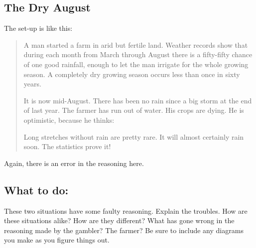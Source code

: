 \documentclass[12pt,letterpaper]{article}
\begin{document}
\subsection*{The Dry August} The set-up is like this:
\begin{quotation}
A man started a farm in arid but fertile land. 
Weather records show that during each month from March through August there is a fifty-fifty chance of one good rainfall, enough to let the man irrigate for the whole growing season. 
A completely dry growing season occurs less than once in sixty years.

It is now mid-August. 
There has been no rain since a big storm at the end of last year. 
The farmer has run out of water. 
His crops are dying. 
He is optimistic, because he thinks:
\begin{center}
Long stretches without rain are pretty rare. 
It will almost certainly rain soon. 
The statistics prove it!
\end{center}
\end{quotation}
Again, there is an error in the reasoning here.

\subsection*{What to do:}

These two situations have some faulty reasoning.
Explain the troubles. 
How are these situations alike? 
How are they different?
What has gone wrong in the reasoning made by the gambler? The farmer?
Be sure to include any diagrams you make as you figure things out.
\end{document}
